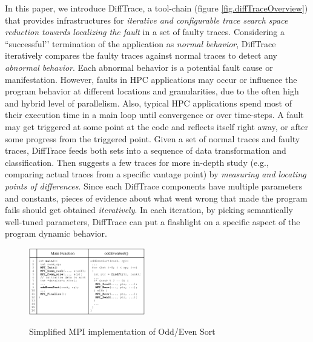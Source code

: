 In this paper, we introduce DiffTrace, a tool-chain (figure \ref{fig.diffTraceOverview}) that provides infrastructures for \textit{iterative and configurable trace search space reduction towards localizing the fault} in a set of faulty traces.
%
Considering a ``successful’’ termination of the application as \textit{normal behavior}, DiffTrace iteratively compares the faulty traces against normal traces to detect any \textit{abnormal behavior}.
%
Each abnormal behavior is a potential fault cause or manifestation.
%
However, faults in HPC applications may occur or influence the program behavior at different locations and granularities, due to the often high and hybrid level of parallelism.
%
Also, typical HPC applications spend most of their execution time in a main loop until convergence or over time-steps.
%
A fault may get triggered at some point at the code and reflects itself right away, or after some progress from the triggered point. 
%
Given a set of normal traces and faulty traces, DiffTrace feeds both sets into a sequence of data transformation and classification. Then suggests a few traces for more in-depth study (e.g., comparing actual traces from a specific vantage point) by \textit{measuring and locating points of differences}.
%
Since each DiffTrace components have multiple parameters and constants, pieces of evidence about what went wrong that made the program fails should get obtained \textit{iteratively}. In each iteration, by picking semantically well-tuned parameters, DiffTrace can put a flashlight on a specific aspect of the program dynamic behavior.
%

\begin{figure}[]
\centering
\caption{Simplified MPI implementation of Odd/Even Sort}
\includegraphics[width=0.45\textwidth]{figs/oddEven.png}
\label{fig.oddEven}
\end{figure}

